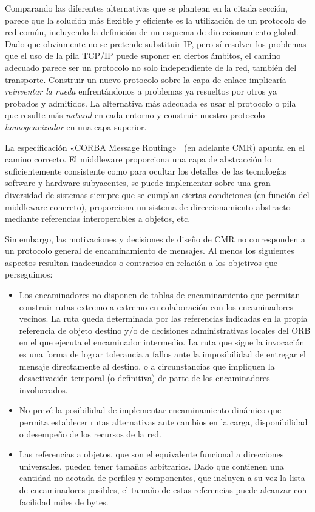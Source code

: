 \documentclass{arco-article}
\def \mw {middleware}
\begin{document}

Comparando las diferentes alternativas que se plantean en la citada
sección, parece que la solución más flexible y eficiente es la
utilización de un protocolo de red común, incluyendo la definición de
un esquema de direccionamiento global. Dado que obviamente no se
pretende substituir \ac{IP}, pero sí resolver los problemas que el uso
de la pila \ac{TCP/IP} puede suponer en ciertos ámbitos, el camino
adecuado parece ser un protocolo no solo independiente de la red,
también del transporte. Construir un nuevo protocolo sobre la capa de
enlace implicaría \emph{reinventar la rueda} enfrentándonos a
problemas ya resueltos por otros ya probados y admitidos. La
alternativa más adecuada es usar el protocolo o pila que resulte más
\emph{natural} en cada entorno y construir nuestro protocolo
\emph{homogeneizador} en una capa superior.

La especificación «\ac{CORBA} Message
Routing»~\cite[cap. 17]{corba-messaging} (en adelante \ac{CMR}) apunta
en el camino correcto. El \mw{} proporciona una capa de abstracción lo
suficientemente consistente como para ocultar los detalles de las
tecnologías software y hardware subyacentes, se puede implementar
sobre una gran diversidad de sistemas siempre que se cumplan ciertas
condiciones (en función del \mw{} concreto), proporciona un sistema de
direccionamiento abstracto mediante referencias interoperables a
objetos, etc.

Sin embargo, las motivaciones y decisiones de diseño de \ac{CMR} no
corresponden a un protocolo general de encaminamiento de mensajes. Al
menos los siguientes aspectos resultan inadecuados o contrarios en
relación a los objetivos que perseguimos:

\begin{itemize}
\item Los encaminadores no disponen de tablas de encaminamiento que
  permitan construir rutas extremo a extremo en colaboración con los
  encaminadores vecinos. La ruta queda determinada por las referencias
  indicadas en la propia referencia de objeto destino y/o de
  decisiones administrativas locales del \ac{ORB} en el que ejecuta el
  encaminador intermedio. La ruta que sigue la invocación es una forma
  de lograr tolerancia a fallos ante la imposibilidad de entregar el
  mensaje directamente al destino, o a circunstancias que impliquen la
  desactivación temporal (o definitiva) de parte de los encaminadores
  involucrados.

\item No prevé la posibilidad de implementar encaminamiento dinámico
  que permita establecer rutas alternativas ante cambios en la carga,
  disponibilidad o desempeño de los recursos de la red.

\item Las referencias a objetos, que son el equivalente funcional a
  direcciones universales, pueden tener tamaños arbitrarios. Dado que
  contienen una cantidad no acotada de perfiles y componentes,
  que incluyen a su vez la lista de encaminadores posibles, el tamaño
  de estas referencias puede alcanzar con facilidad miles de bytes.
\end{itemize}
\end{document}

